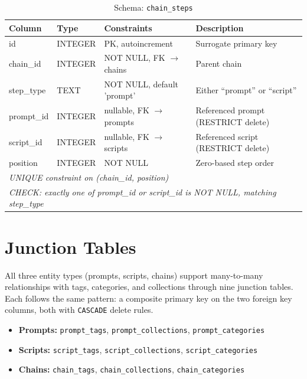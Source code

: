 \documentclass[a4paper, 11pt, oneside]{report}
\begin{document}
\begin{table}[H]
  \centering
  \caption{Schema: \texttt{chain\_steps}}
  \label{tab:schema-chain-steps}
  \begin{tabularx}{\textwidth}{l l l X}
    \toprule
    \textbf{Column} & \textbf{Type} & \textbf{Constraints} & \textbf{Description} \\
    \midrule
    id        & INTEGER & PK, autoincrement        & Surrogate primary key \\
    chain\_id & INTEGER & NOT NULL, FK $\to$ chains & Parent chain \\
    step\_type& TEXT    & NOT NULL, default 'prompt'& Either ``prompt'' or ``script'' \\
    prompt\_id& INTEGER & nullable, FK $\to$ prompts& Referenced prompt (RESTRICT delete) \\
    script\_id& INTEGER & nullable, FK $\to$ scripts& Referenced script (RESTRICT delete) \\
    position  & INTEGER & NOT NULL                  & Zero-based step order \\
    \multicolumn{4}{l}{\textit{UNIQUE constraint on (chain\_id, position)}} \\
    \multicolumn{4}{l}{\textit{CHECK: exactly one of prompt\_id or script\_id is NOT NULL, matching step\_type}} \\
    \bottomrule
  \end{tabularx}
\end{table}

\section{Junction Tables}
\label{sec:junction}

All three entity types (prompts, scripts, chains) support many-to-many
relationships with tags, categories, and collections through nine junction
tables.  Each follows the same pattern: a composite primary key on the
two foreign key columns, both with \texttt{CASCADE} delete rules.

\begin{itemize}
  \item \textbf{Prompts:} \texttt{prompt\_tags}, \texttt{prompt\_collections},
        \texttt{prompt\_categories}
  \item \textbf{Scripts:} \texttt{script\_tags}, \texttt{script\_collections},
        \texttt{script\_categories}
  \item \textbf{Chains:} \texttt{chain\_tags}, \texttt{chain\_collections},
        \texttt{chain\_categories}
\end{itemize}
\end{document}
